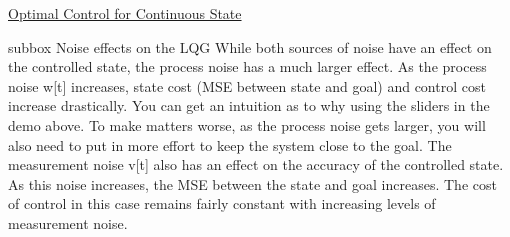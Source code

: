 \begin{textbox}{\href{https://compneuro.neuromatch.io/tutorials/W3D3_OptimalControl/student/W3D3_Tutorial2.html}{Optimal Control for Continuous State}}
\begin{subbox}{subbox}{  Noise effects on the LQG}
While both sources of noise have an effect on the controlled state, the
process noise has a much larger effect. As the process noise w[t] increases,
state cost (MSE between state and goal) and  control cost increase drastically.
You can get an intuition as to why using the sliders in the demo above.  To make
matters worse, as the process noise gets larger, you will also need to put in
more effort to keep the system close to the goal.
The measurement noise v[t]  also has an effect on the accuracy of the
controlled state. As this noise increases, the MSE between the state and goal
increases. The cost of control in this case remains fairly constant with
increasing levels of measurement noise.

\end{subbox}
\end{textbox}
